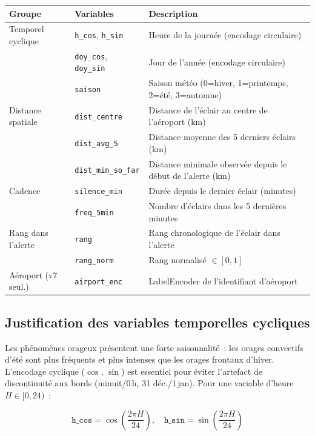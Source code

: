 \documentclass[a4paper,11pt]{article}
\begin{document}
\begin{center}
\begin{tabular}{llp{7.5cm}}
\toprule
\textbf{Groupe} & \textbf{Variables} & \textbf{Description} \\
\midrule
Temporel cyclique & \texttt{h\_cos}, \texttt{h\_sin} & Heure de la journée (encodage circulaire) \\
 & \texttt{doy\_cos}, \texttt{doy\_sin} & Jour de l'année (encodage circulaire) \\
 & \texttt{saison} & Saison météo (0=hiver, 1=printemps, 2=été, 3=automne) \\
\midrule
Distance spatiale & \texttt{dist\_centre} & Distance de l'éclair au centre de l'aéroport (km) \\
 & \texttt{dist\_avg\_5} & Distance moyenne des 5 derniers éclairs (km) \\
 & \texttt{dist\_min\_so\_far} & Distance minimale observée depuis le début de l'alerte (km) \\
\midrule
Cadence & \texttt{silence\_min} & Durée depuis le dernier éclair (minutes) \\
 & \texttt{freq\_5min} & Nombre d'éclairs dans les 5 dernières minutes \\
\midrule
Rang dans l'alerte & \texttt{rang} & Rang chronologique de l'éclair dans l'alerte \\
 & \texttt{rang\_norm} & Rang normalisé $\in [0,1]$ \\
\midrule
Aéroport (v7 seul.) & \texttt{airport\_enc} & LabelEncoder de l'identifiant d'aéroport \\
\bottomrule
\end{tabular}
\end{center}

\subsection{Justification des variables temporelles cycliques}

Les phénomènes orageux présentent une forte saisonnalité~: les orages convectifs d'été sont plus
fréquents et plus intenses que les orages frontaux d'hiver. L'encodage cyclique ($\cos$, $\sin$)
est essentiel pour éviter l'artefact de discontinuité aux bords (minuit/0\,h, 31 déc./1\,jan).
Pour une variable d'heure $H \in [0, 24)$~:

\begin{equation}
  \texttt{h\_cos} = \cos\!\left(\frac{2\pi H}{24}\right), \quad
  \texttt{h\_sin} = \sin\!\left(\frac{2\pi H}{24}\right)
  \label{eq:cyclic}
\end{equation}
\end{document}
